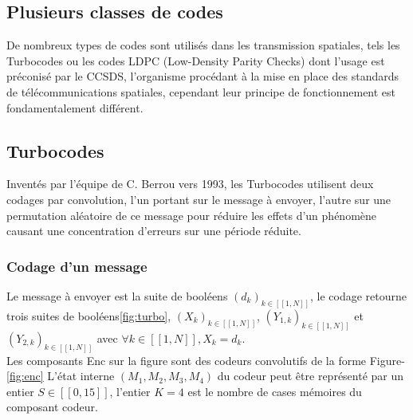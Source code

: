 \documentclass[12pt]{article}
\begin{document}
\subsection{Plusieurs classes de codes}
De nombreux types de codes sont utilis\'es dans les transmission spatiales, tels les Turbocodes ou les codes LDPC (Low-Density Parity Checks) dont l'usage est pr\'econis\'e par le CCSDS, l'organisme proc\'edant \`a la mise en place des standards de t\'el\'ecommunications spatiales, cependant leur principe de fonctionnement est fondamentalement diff\'erent.


\subsection{Turbocodes}
Invent\'es par l'\'equipe de C. Berrou vers 1993, les Turbocodes utilisent deux codages par convolution, l'un portant sur le message \`a envoyer, l'autre sur une permutation al\'eatoire de ce message pour r\'eduire les effets d'un ph\'enom\`ene causant une concentration d'erreurs sur une p\'eriode r\'eduite.


\subsubsection{Codage d'un message}
Le message \`a envoyer est la suite de bool\'eens $(d_k)_{k \in [\![1, N]\!]}$, le codage retourne trois suites de bool\'eens\ref{fig:turbo}, $(X_k)_{k \in [\![1, N]\!]}$, $(Y_{1,k})_{k \in [\![1, N]\!]}$ et $(Y_{2,k})_{k \in [\![1, N]\!]}$ avec $\forall k \in [\![1, N]\!], X_k = d_k$.\\
Les composants Enc sur la figure sont des codeurs convolutifs de la forme Figure-\ref{fig:enc}
L'\'etat interne $(M_1, M_2, M_3, M_4)$ du codeur peut \^etre repr\'esent\'e par un entier $S \in [\![0, 15]\!]$, l'entier $K = 4$ est le nombre de cases m\'emoires du composant codeur.
\end{document}
